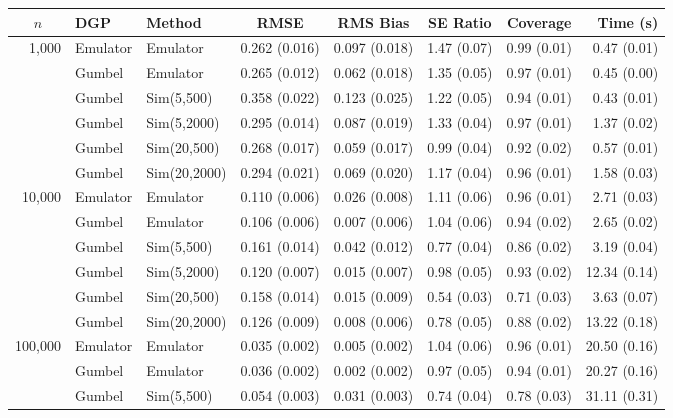 \begin{table}[htbp]
\centering
\footnotesize
\begin{tabular}{@{}rllrrrrr@{}}
\toprule
\multicolumn{1}{c}{$n$} & \multicolumn{1}{l}{DGP} & \multicolumn{1}{l}{Method} & \multicolumn{1}{c}{RMSE} & \multicolumn{1}{c}{RMS Bias} & \multicolumn{1}{c}{SE Ratio} & \multicolumn{1}{c}{Coverage} & \multicolumn{1}{r}{Time (s)} \\
\midrule
\multirow{6}{*}{1,000} & Emulator & Emulator & 0.262 (0.016) & 0.097 (0.018) & 1.47 (0.07) & 0.99 (0.01) & 0.47 (0.01) \\
 & Gumbel & Emulator & 0.265 (0.012) & 0.062 (0.018) & 1.35 (0.05) & 0.97 (0.01) & 0.45 (0.00) \\
 & Gumbel & Sim(5,500) & 0.358 (0.022) & 0.123 (0.025) & 1.22 (0.05) & 0.94 (0.01) & 0.43 (0.01) \\
 & Gumbel & Sim(5,2000) & 0.295 (0.014) & 0.087 (0.019) & 1.33 (0.04) & 0.97 (0.01) & 1.37 (0.02) \\
 & Gumbel & Sim(20,500) & 0.268 (0.017) & 0.059 (0.017) & 0.99 (0.04) & 0.92 (0.02) & 0.57 (0.01) \\
 & Gumbel & Sim(20,2000) & 0.294 (0.021) & 0.069 (0.020) & 1.17 (0.04) & 0.96 (0.01) & 1.58 (0.03) \\
\midrule
\multirow{6}{*}{10,000} & Emulator & Emulator & 0.110 (0.006) & 0.026 (0.008) & 1.11 (0.06) & 0.96 (0.01) & 2.71 (0.03) \\
 & Gumbel & Emulator & 0.106 (0.006) & 0.007 (0.006) & 1.04 (0.06) & 0.94 (0.02) & 2.65 (0.02) \\
 & Gumbel & Sim(5,500) & 0.161 (0.014) & 0.042 (0.012) & 0.77 (0.04) & 0.86 (0.02) & 3.19 (0.04) \\
 & Gumbel & Sim(5,2000) & 0.120 (0.007) & 0.015 (0.007) & 0.98 (0.05) & 0.93 (0.02) & 12.34 (0.14) \\
 & Gumbel & Sim(20,500) & 0.158 (0.014) & 0.015 (0.009) & 0.54 (0.03) & 0.71 (0.03) & 3.63 (0.07) \\
 & Gumbel & Sim(20,2000) & 0.126 (0.009) & 0.008 (0.006) & 0.78 (0.05) & 0.88 (0.02) & 13.22 (0.18) \\
\midrule
\multirow{6}{*}{100,000} & Emulator & Emulator & 0.035 (0.002) & 0.005 (0.002) & 1.04 (0.06) & 0.96 (0.01) & 20.50 (0.16) \\
 & Gumbel & Emulator & 0.036 (0.002) & 0.002 (0.002) & 0.97 (0.05) & 0.94 (0.01) & 20.27 (0.16) \\
 & Gumbel & Sim(5,500) & 0.054 (0.003) & 0.031 (0.003) & 0.74 (0.04) & 0.78 (0.03) & 31.11 (0.31) \\

\end{tabular}
\end{table}
